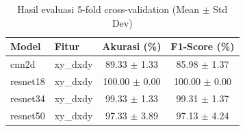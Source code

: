 
\begin{table}[H]
  \centering
  \caption{Hasil evaluasi 5-fold cross-validation (Mean $\pm$ Std Dev)}
  \label{tab:hasil-kfold}
  \begin{tabular}{|l|l|c|c|}
  \hline
  \textbf{Model} & \textbf{Fitur} & \textbf{Akurasi (\%)} & \textbf{F1-Score (\%)} \\ \hline
cnn2d & xy_dxdy & 89.33 $\pm$ 1.33 & 85.98 $\pm$ 1.37 \\ \hline
resnet18 & xy_dxdy & 100.00 $\pm$ 0.00 & 100.00 $\pm$ 0.00 \\ \hline
resnet34 & xy_dxdy & 99.33 $\pm$ 1.33 & 99.31 $\pm$ 1.37 \\ \hline
resnet50 & xy_dxdy & 97.33 $\pm$ 3.89 & 97.13 $\pm$ 4.24 \\ \hline
  \end{tabular}
\end{table}
